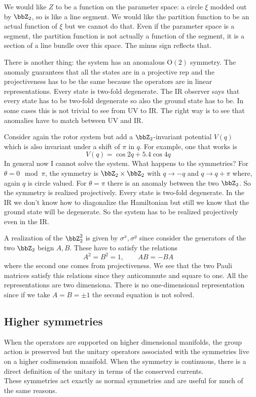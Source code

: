 \documentclass[11pt]{article}
\theoremstyle{definition}
\numberwithin{equation}{section}
\newcommand*\OO{\mathrm{O}}
\begin{document}
We would like $Z$ to be a function on the parameter space: a circle $\xi$ modded out by $\bbZ_{2}$, so is like a line segment. We would like the partition function to be an actual function of $\xi$ but we cannot do that. Even if the parameter space is a segment, the partition function is not actually a function of the segment, it is a section of a line bundle over this space. The minus sign reflects that.

There is another thing: the system has an anomalous $\OO(2)$ symmetry. The anomaly guarantees that all the states are in a projective rep and the projectiveness has to be the same because the operators are in linear representations. Every state is two-fold degenerate. The IR observer says that every state has to be two-fold degenerate so also the ground state has to be. In some cases this is not trivial to see from UV to IR. The right way is to see that anomalies have to match between UV and IR.

Consider again the rotor system but add a $\bbZ_{2}$-invariant potential $V(q)$ which is also invariant under a shift of $\pi$ in $q$. For example, one that works is
\begin{equation}
	V(q)=\cos 2q+5.4\cos 4q
\end{equation}
In general now I cannot solve the system. What happens to the symmetries? For $\theta=0 \mod \pi$, the symmetry is $\bbZ_{2}\times\bbZ_{2}$ with $q\rightarrow -q$ and $q\rightarrow q+\pi$ where, again $q$ is circle valued. For $\theta=\pi$ there is an anomaly between the two $\bbZ_{2}$. So the symmetry is realized projectively. Every state is two-fold degenerate. In the IR we don't know how to diagonalize the Hamiltonian but still we know that the ground state will be degenerate. So the system has to be realized projectively even in the IR.

A realization of the $\bbZ_{2}^{2}$ is given by $\sigma^{x},\sigma^{y}$ since consider the generators of the two $\bbZ_{2}$ beign $A,B$. These have to satisfy the relations
\begin{equation}
	A^{2}=B^{2}=1,\qquad AB=-BA
\end{equation}
where the second one comes from projectiveness. We see that the two Pauli matrices satisfy this relations since they anticommute and square to one. All the representations are two dimensiona. There is no one-dimensional representation since if we take $A=B=\pm1$ the second equation is not solved.

\subsection{Higher symmetries}
When the operators are supported on higher dimensional manifolds, the group action is preserved but the unitary operators associated with the symmetries live on a higher codimension manifold. When the symmetry is continuous, there is a direct definition of the unitary in terms of the conserved currents.\\
These symmetries act exactly as normal symmetries and are useful for much of the same reasons.
\end{document}
